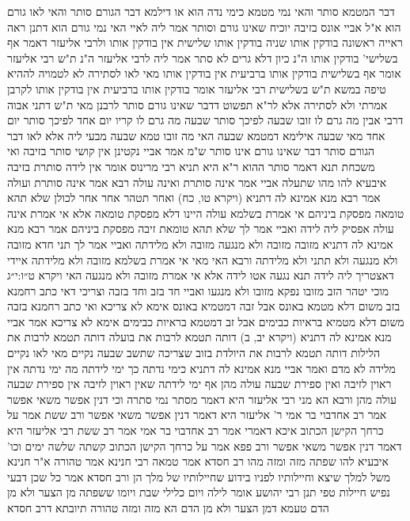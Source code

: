 \documentclass[12pt, openany]{book}
\begin{document}
{דבר המטמא סותר והאי נמי מטמא כימי נדה הוא או דילמא דבר הגורם סותר והאי לאו גורם הוא 
א"ל אביי אונס בזיבה יוכיח שאינו גורם וסותר 
אמר ליה לאיי האי נמי גורם הוא דתנן ראה ראייה ראשונה בודקין אותו שניה בודקין אותו שלישית אין בודקין אותו 
ולרבי אליעזר דאמר אף בשלישי' בודקין אותו ה"נ כיון דלא גרים לא סתר אמר ליה לרבי אליעזר ה"נ 
ת"ש רבי אליעזר אומר אף בשלישית בודקין אותו ברביעית אין בודקין אותו מאי לאו לסתירה 
לא לטמויה לההיא טיפה במשא 
ת"ש בשלישית רבי אליעזר אומר בודקין אותו ברביעית אין בודקין אותו לקרבן אמרתי ולא לסתירה 
אלא לר"א תפשוט דדבר שאינו גורם סותר לרבנן מאי 
ת"ש דתני אבוה דרבי אבין מה גרם לו זובו שבעה לפיכך סותר שבעה מה גרם לו קריו יום אחד לפיכך סותר יום אחד 
מאי שבעה אילימא דמטמא שבעה האי מה זובו טמא שבעה מבעי ליה אלא לאו דבר הגורם סותר דבר שאינו גורם אינו סותר ש"מ 
אמר אביי נקטינן אין קושי סותר בזיבה ואי משכחת תנא דאמר סותר ההוא ר"א היא 
תניא רבי מרינוס אומר אין לידה סותרת בזיבה איבעיא להו מהו שתעלה אביי אמר אינה סותרת ואינה עולה רבא אמר אינה סותרת ועולה 
אמר רבא מנא אמינא לה דתניא (ויקרא טו, כח) ואחר תטהר אחר אחר לכולן שלא תהא טומאה מפסקת ביניהם 
אי אמרת בשלמא עולה היינו דלא מפסקת טומאה אלא אי אמרת אינה עולה אפסיק ליה לידה ואביי אמר לך שלא תהא טומאת זיבה מפסקת ביניהם 
אמר רבא מנא אמינא לה דתניא מזובה מזובה ולא מנגעה מזובה ולא מלידתה ואביי אמר לך תני חדא מזובה ולא מנגעה ולא תתני ולא מלידתה 
ורבא האי מאי אי אמרת בשלמא מזובה ולא מלידתה איידי דאצטריך ליה לידה תנא נגעה אטו לידה אלא אי אמרת מזובה ולא מנגעה האי {ויקרא ט״ו:י״ג } מוכי יטהר הזב מזובו נפקא מזובו ולא מנגעו 
ואביי חד בזב וחד בזבה וצריכי דאי כתב רחמנא
בזב משום דלא מטמא באונס אבל זבה דמטמיא באונס אימא לא צריכא 
ואי כתב רחמנא בזבה משום דלא מטמיא בראיות כבימים אבל זב דמטמא בראיות כבימים אימא לא צריכא 
אמר אביי מנא אמינא לה דתניא (ויקרא יב, ב) דותה תטמא לרבות את בועלה
דותה תטמא לרבות את הלילות דותה תטמא לרבות את היולדת בזוב שצריכה שתשב שבעה נקיים 
מאי לאו נקיים מלידה לא מדם 
ואמר אביי מנא אמינא לה דתניא כימי נדתה כך ימי לידתה מה ימי נדתה אין ראוין לזיבה ואין ספירת שבעה עולה מהן אף ימי לידתה שאין ראוין לזיבה אין ספירת שבעה עולה מהן 
ורבא הא מני רבי אליעזר היא דאמר מסתר נמי סתרה 
וכי דנין אפשר משאי אפשר 
אמר רב אחדבוי בר אמי ר' אליעזר היא דאמר דנין אפשר משאי אפשר ורב ששת אמר על כרחך הקישן הכתוב איכא דאמרי אמר רב אחדבוי בר אמי אמר רב ששת רבי אליעזר היא דאמר דנין אפשר משאי אפשר ורב פפא אמר על כרחך הקישן הכתוב
קשתה שלשה ימים וכו'
איבעיא להו שפתה מזה ומזה מהו רב חסדא אמר טמאה רבי חנינא אמר טהורה 
א"ר חנינא משל למלך שיצא וחיילותיו לפניו בידוע שחיילותיו של מלך הן 
ורב חסדא אמר כל שכן דבעי נפיש חיילות טפי 
תנן רבי יהושע אומר לילה ויום כלילי שבת ויומו ששפתה מן הצער ולא מן הדם טעמא דמן הצער ולא מן הדם הא מזה ומזה טהורה תיובתא דרב חסדא 
}
\end{document}
